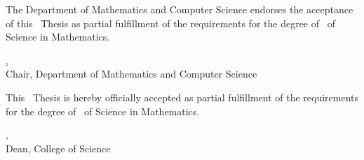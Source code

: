\documentclass[a4paper, 12pt]{report}
\newif\ifexaminer     \examinertrue
\begin{document}
    

\vspace{1cm}
\noindent The Department of Mathematics and Computer Science endorses the acceptance of this \thesistype\ Thesis as partial fulfillment of the requirements for the degree of \degreeonly\ of Science in Mathematics.\\

\vspace{1cm}
\noindent\begin{minipage}{\textwidth}
	\noindent\underline{\MakeUppercase{\chair}, \chairdegree}\\
	Chair, Department of Mathematics and Computer Science
\end{minipage}
\vspace{1 cm}

\noindent This \thesistype\ Thesis is hereby officially accepted as partial fulfillment of the requirements for the degree of \degreeonly\ of Science in Mathematics.\\

\vspace{1cm}
\hfill \begin{minipage}{6cm}
	\centering
	\underline{\MakeUppercase{\dean}, \deandegree}\\
	Dean, College of Science
\end{minipage}
	
\end{document}
